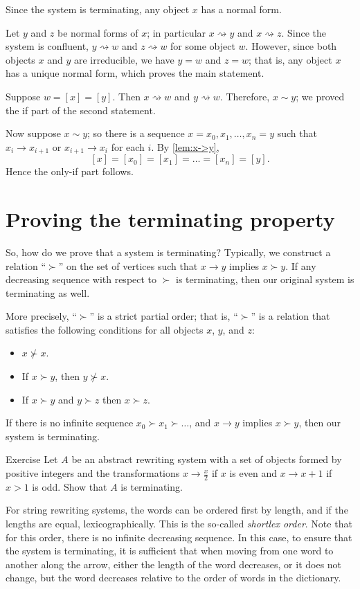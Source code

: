 Since the system is terminating, any object $x$ has a normal form.

Let $y$ and $z$ be normal forms of $x$;
in particular $x\rightsquigarrow y$ and $x\rightsquigarrow z$.
Since the system is confluent, $y\rightsquigarrow w$ and $z\rightsquigarrow w$ for some object $w$.
However, since both objects $x$ and $y$ are irreducible, we have $y= w$ and $z= w$;
that is, any object $x$ has a unique normal form, which proves the main statement.

Suppose $w=[x]=[y]$.
Then $x\rightsquigarrow w$ and $y\rightsquigarrow w$.
Therefore, $x\sim y$;
we proved the if part of the second statement.

Now suppose $x\sim y$;
so there is a sequence $x=x_0,x_1,\dots,x_n=y$ such that $x_i\to x_{i+1}$ or $x_{i+1}\to x_i$ for each $i$.
By \ref{lem:x->y},
\[[x]=[x_0]=[x_1]=\dots=[x_n]=[y].\]
Hence the only-if part follows.
\qeds

\section{Proving the terminating property}

So, how do we prove that a system is terminating?
Typically, we construct a relation ``$\succ$'' on the set of vertices such that 
$x \to y$ implies $x\succ y$.
If any decreasing sequence with respect to $\succ$ is terminating,
then our original system is terminating as well. 

More precisely, ``$\succ$'' is a strict partial order;
that is, ``$\succ$'' is a relation that satisfies the following conditions for all objects $x$, $y$, and $z$:
\begin{itemize}
\item $x\nsucc x$.
\item If $x\succ y$, then  $y\nsucc x$.
\item If $x\succ y$ and $y\succ z$ then  $x\succ z$.
\end{itemize}
If there is no infinite sequence $x_0\succ x_1\succ\dots$,
and $x\to y$ implies $x\succ y$, then our system is terminating.

\begin{thm}{Exercise}\label{ex:x+1}
Let $A$ be an abstract rewriting system
with a set of objects formed by positive integers 
and the transformations $x\to \tfrac x2$ if $x$ is even and $x\to x+1$ if $x>1$ is odd.
Show that $A$ is terminating.
\end{thm}

For string rewriting systems, the words can be ordered first by length, and if the lengths are equal, lexicographically.
This is the so-called \emph{shortlex order}.
Note that for this order, there is no infinite decreasing sequence.
In this case, to ensure that the system is terminating, it is sufficient that when moving from one word to another along the arrow, either the length of the word decreases, or it does not change, but the word decreases relative to the order of words in the dictionary.


